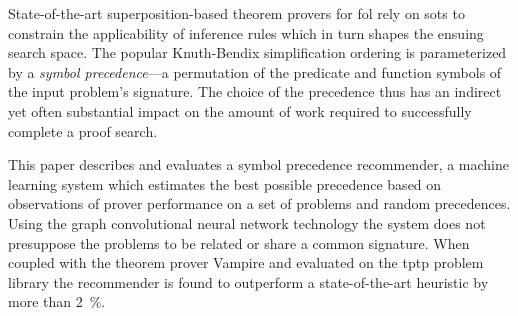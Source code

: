 


State-of-the-art superposition-based theorem provers for \acrlong{fol}
rely on \glspl{sot} to constrain the applicability of inference rules 
which in turn shapes the ensuing search space.
The popular Knuth-Bendix simplification ordering is parameterized by 
a \emph{symbol precedence}---a permutation of the predicate and function symbols
of the input problem's signature.
The choice of the precedence thus has an indirect yet often substantial impact 
on the amount of work required to successfully complete a proof search.


This paper describes and evaluates a symbol precedence recommender,
a machine learning system which estimates the best possible precedence
based on observations of prover performance on a set of problems and random precedences.
Using the graph convolutional neural network technology
the system does not presuppose the problems to be related or share a common signature. 
When coupled with the theorem prover Vampire and evaluated on the \acrshort{tptp} problem library
the recommender is found to outperform a state-of-the-art heuristic by more than \SI{2}{\percent}.

\iffalse
This paper describes and evaluates a symbol precedence recommender based on a \acrlong{gcn}.
When trained on proof attempts that use random symbol precedences,
the recommender outperforms the state of the art heuristic by more than \SI{2}{\percent}.
The symbol precedences predicted by the recommender
specify Knuth-Bendix \glspl{sot}.
These orderings in turn guide the proof search in the state-of-the-art \acrlong{atp} Vampire
by constraining the inferences in the superposition calculus.
\todo{MS: uz i ty ``random symbol precedences'', kterymi to vypraveni nahore zacina potrebuji vampira.
Mozna bude lepsi, trochu nudne, zacit tim, odkud se berou a na co se pouzivaji precedence
a teprve pak rict, ze se z nich ucime a pak umime navrhovat nove, lepsi?}
The recommender is evaluated on \acrlong{fol} problems from the \acrshort{tptp} problem library.
\fi


